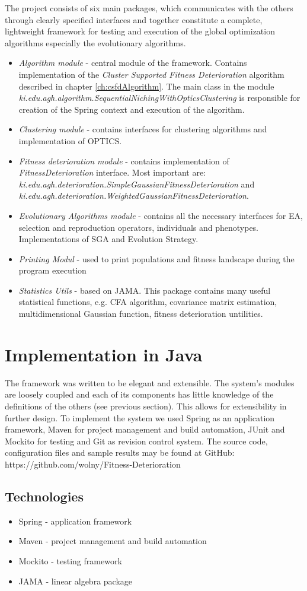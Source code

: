 The project consists of six main packages, which communicates with the
others through clearly specified interfaces and together constitute a
complete, lightweight framework for testing and execution of the global 
optimization algorithms especially the evolutionary algorithms.
\begin{itemize}
  \item \textit{Algorithm module} - central module of the framework. Contains
  implementation of the \textit{Cluster Supported Fitness Deterioration}
  algorithm described in chapter \ref{ch:csfdAlgorithm}. The main class in the module
  \textit{ki.edu.agh.algorithm.SequentialNichingWithOpticsClustering} is
  responsible for creation of the Spring context and execution of the algorithm. 
  \item \textit{Clustering module} - contains interfaces for clustering
  algorithms and implementation of OPTICS.
  \item \textit{Fitness deterioration module} - contains implementation of
  \textit{FitnessDeterioration} interface. Most important are:
  \textit{ki.edu.agh.deterioration.SimpleGaussianFitnessDeterioration} and 
  \textit{ki.edu.agh.deterioration.WeightedGaussianFitnessDeterioration}.
  \item \textit{Evolutionary Algorithms module} - contains all the necessary
  interfaces for EA, selection and reproduction operators, individuals and
  phenotypes. Implementations of SGA and Evolution Strategy. 
  \item \textit{Printing Modul} - used to print populations and fitness
  landscape during the program execution
  \item \textit{Statistics Utils} - based on JAMA. This package
  contains many useful statistical functions, e.g. CFA algorithm, covariance
  matrix estimation, multidimensional Gaussian function, fitness deterioration
  untilities.
\end{itemize}

\section{Implementation in Java}
\label{sec:impl}

The framework was written to be elegant and extensible. The system's 
modules are loosely coupled and each of its components has little knowledge of
the definitions of the others (see previous section). This
allows for extensibility in further design. To implement the system we used Spring
as an application framework, Maven for project
management and build automation, JUnit and Mockito
for testing and Git as revision control system. 
The source code, configuration files and sample results may be found at 
GitHub: https://github.com/wolny/Fitness-Deterioration

\subsection{Technologies}
\begin{itemize}
  \item Spring - application framework
  \item Maven - project management and build automation
  \item Mockito - testing framework 
  \item JAMA - linear algebra package
\end{itemize}
